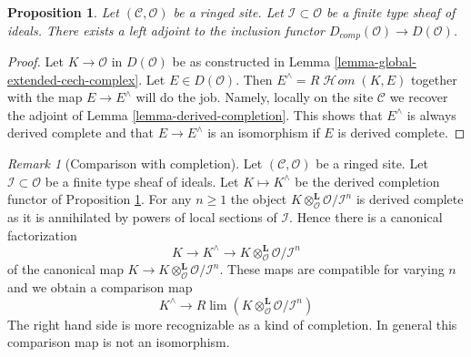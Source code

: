 \documentclass{stacks-project}
\theoremstyle{plain}
\newtheorem{proposition}[subsection]{Proposition}
\theoremstyle{definition}
\theoremstyle{remark}
\newtheorem{remark}[subsection]{Remark}
\numberwithin{equation}{subsection}
\def\lim{\mathop{\mathrm{lim}}\nolimits}
\def\SheafHom{\mathop{\mathcal{H}\!\mathit{om}}\nolimits}
\begin{document}
\begin{proposition}
\label{proposition-derived-completion}
Let $(\mathcal{C}, \mathcal{O})$ be a ringed site.
Let $\mathcal{I} \subset \mathcal{O}$ be a finite type sheaf of
ideals. There exists a left adjoint to the inclusion
functor $D_{comp}(\mathcal{O}) \to D(\mathcal{O})$.
\end{proposition}

\begin{proof}
Let $K \to \mathcal{O}$ in $D(\mathcal{O})$ be as constructed in
Lemma \ref{lemma-global-extended-cech-complex}. Let $E \in D(\mathcal{O})$.
Then $E^\wedge = R\SheafHom(K, E)$ together with the map $E \to E^\wedge$
will do the job. Namely, locally on the site $\mathcal{C}$ we
recover the adjoint of Lemma \ref{lemma-derived-completion}.
This shows that $E^\wedge$ is always derived complete and that
$E \to E^\wedge$ is an isomorphism if $E$ is derived complete.
\end{proof}

\begin{remark}[Comparison with completion]
\label{remark-compare-with-completion}
Let $(\mathcal{C}, \mathcal{O})$ be a ringed site.
Let $\mathcal{I} \subset \mathcal{O}$ be a finite type sheaf of
ideals. Let $K \mapsto K^\wedge$ be the derived completion functor
of Proposition \ref{proposition-derived-completion}.
For any $n \geq 1$ the object
$K \otimes_\mathcal{O}^\mathbf{L} \mathcal{O}/\mathcal{I}^n$
is derived complete as it is annihilated by powers of
local sections of $\mathcal{I}$. Hence there is a canonical factorization
$$
K \to K^\wedge \to K \otimes_\mathcal{O}^\mathbf{L} \mathcal{O}/\mathcal{I}^n
$$
of the canonical map
$K \to K \otimes_\mathcal{O}^\mathbf{L} \mathcal{O}/\mathcal{I}^n$.
These maps are compatible for varying $n$ and we obtain a comparison map
$$
K^\wedge
\longrightarrow
R\lim \left(K \otimes_\mathcal{O}^\mathbf{L} \mathcal{O}/\mathcal{I}^n\right)
$$
The right hand side is more recognizable as a kind of completion.
In general this comparison map is not an isomorphism.
\end{remark}
\end{document}
